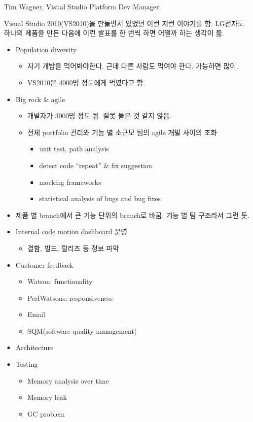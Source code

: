 \documentclass[a4paper]{article}
\begin{document}
Tim Wagner, Visual Studio Platform Dev Manager.
 
Visual Studio 2010(VS2010)을 만들면서 있었던 이런 저런 이야기를
함. LG전자도 하나의 제품을 만든 다음에 이런 발표를 한 번씩 하면 어떨까
하는 생각이 듦.
 
\begin{itemize}
\item Population diversity
    \begin{itemize}
    \item 자기 개밥을 먹어봐야한다. 근데 다른 사람도 먹여야 한다. 가능하면 많이.
    \item VS2010은 4000명 정도에게 먹였다고 함.
    \end{itemize}
\item Big rock \& agile
    \begin{itemize}
    \item 개발자가 3000명 정도 됨. 잘못 들은 것 같지 않음.
    \item 전체 portfolio 관리와 기능 별 소규모 팀의 agile 개발 사이의 조화
        \begin{itemize}
        \item unit test, path analysis
        \item detect code ``repeat'' \& fix suggestion
        \item mocking frameworks
        \item statistical analysis of bugs and bug fixes
        \end{itemize}
    \end{itemize}
\item 제품 별 branch에서 큰 기능 단위의 branch로 바꿈.  기능 별 팀 구조라서 그런 듯.
\item Internal code motion dashboard 운영
    \begin{itemize}
    \item 결함, 빌드, 릴리즈 등 정보 파악
    \end{itemize}
\item Customer feedback
    \begin{itemize}
    \item Watson: functionality
    \item PerfWatsons: responsiveness
    \item Email
    \item SQM(software quality management)
    \end{itemize}
\item Architecture
\item Testing
    \begin{itemize}
    \item Memory analysis over time
    \item Memory leak
    \item GC problem
    \end{itemize}
\end{itemize}
 
\end{document}
